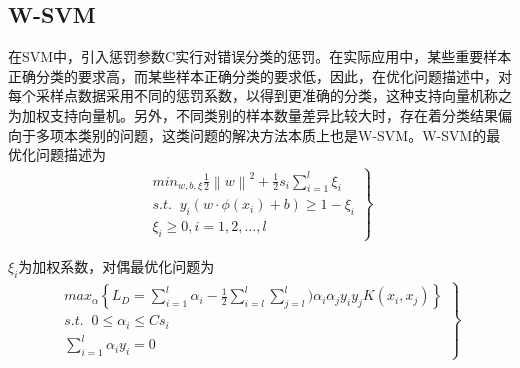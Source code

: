 \documentclass[UTF8]{ctexart}
\begin{document}
\subsection*{W-SVM}
\par 在SVM中，引入惩罚参数C实行对错误分类的惩罚。在实际应用中，某些重要样本正确分类的要求高，而某些样本正确分类的要求低，因此，在优化问题描述中，对每个采样点数据采用不同的惩罚系数，以得到更准确的分类，这种支持向量机称之为加权支持向量机。另外，不同类别的样本数量差异比较大时，存在着分类结果偏向于多项本类别的问题，这类问题的解决方法本质上也是W-SVM。W-SVM的最优化问题描述为
\begin{eqnarray}     
\left.            
\begin{array}{ccc}     
min_{w,b,\xi }\frac{1}{2}\left \| w \right \|^{2} +\frac{1}{2}s_{i} \sum_{i=1}^{l}\xi _{i}\\
s.t.\; \; y_{i}(w\cdot \phi (x_{i})+b) \geq  1 -\xi _{i}\\
\xi _{i}\geq 0,i=1,2,\dots,l
\end{array}          
\right\}         
\end{eqnarray} 
\par $\xi_{i}$为加权系数，对偶最优化问题为
\begin{eqnarray}     
\left.            
\begin{array}{ccc}     
max_{\alpha} \left \{ L_{D}=\sum_{i=1}^{l}\alpha_{i}-\frac{1}{2}\sum_{i=l}^{l}\sum_{j=l}^{l})\alpha _{i} \alpha _{j} y_{i} y_{j}K(x_{i},x_{j}) \right \} \\
s.t.\; \; 0\leq \alpha _{i}\leq Cs_{i} \\
\sum_{i=1}^{l}\alpha _{i}y_{i}=0
\end{array}          
\right\}         
\end{eqnarray} 
\newpage
\end{document}
